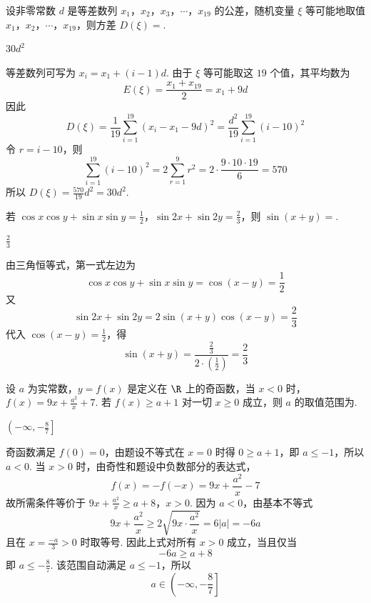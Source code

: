 \begin{problem}
设非零常数 \(d\) 是等差数列 \(x_1\)，\(x_2\)，\(x_3\)，\(\cdots\)，\(x_{19}\) 的公差，随机变量 \(\xi\) 等可能地取值 \(x_1\)，\(x_2\)，\(\cdots\)，\(x_{19}\)，则方差 \(D(\xi)=\)\fillinblank{}.
\begin{answer}
\(30d^2\)
\end{answer}

\begin{solution}
等差数列可写为 \(x_i=x_1+(i-1)d\). 由于 \(\xi\) 等可能取这 \(19\) 个值，其平均数为
\[
E(\xi)=\frac{x_1+x_{19}}{2}=x_1+9d
\]
因此
\[
D(\xi)=\frac{1}{19}\sum_{i=1}^{19}(x_i-x_1-9d)^2
=\frac{d^2}{19}\sum_{i=1}^{19}(i-10)^2
\]
令 \(r=i-10\)，则
\[
\sum_{i=1}^{19}(i-10)^2=2\sum_{r=1}^{9}r^2
=2\cdot\frac{9\cdot10\cdot19}{6}=570
\]
所以 \(D(\xi)=\frac{570}{19}d^2=30d^2\).
\end{solution}
\end{problem}

\begin{problem}
若 \(\cos x\cos y+\sin x\sin y=\frac{1}{2}\)，\(\sin 2x+\sin 2y=\frac{2}{3}\)，则 \(\sin(x+y)=\)\fillinblank{}.
\begin{answer}
\(\frac{2}{3}\)
\end{answer}

\begin{solution}
由三角恒等式，第一式左边为
\[
\cos x\cos y+\sin x\sin y=\cos(x-y)=\frac{1}{2}
\]
又
\[
\sin2x+\sin2y=2\sin(x+y)\cos(x-y)=\frac{2}{3}
\]
代入 \(\cos(x-y)=\frac12\)，得
\[
\sin(x+y)=\frac{\frac{2}{3}}{2\cdot(\frac{1}{2})}=\frac{2}{3}
\]
\end{solution}
\end{problem}

\begin{problem}
设 \(a\) 为实常数，\(y=f(x)\) 是定义在 \(\R\) 上的奇函数，当 \(x<0\) 时， \(f(x)=9x+\frac{a^2}{x}+7\).
若 \(f(x)\geqslant a+1\) 对一切 \(x\geqslant 0\) 成立，则 \(a\) 的取值范围为\fillinblank{}.
\begin{answer}
\(\left(-\infty,-\frac{8}{7}\right]\)
\end{answer}

\begin{solution}
奇函数满足 \(f(0)=0\)，由题设不等式在 \(x=0\) 时得 \(0\geqslant a+1\)，即 \(a\leqslant-1\)，所以 \(a<0\). 当 \(x>0\) 时，由奇性和题设中负数部分的表达式，
\[
f(x)=-f(-x)=9x+\frac{a^2}{x}-7
\]
故所需条件等价于
\(9x+\frac{a^2}{x}\geqslant a+8\)，\(x>0\).
因为 \(a<0\)，由基本不等式
\[
9x+\frac{a^2}{x}\geqslant2\sqrt{9x\cdot\frac{a^2}{x}}=6|a|=-6a
\]
且在 \(x=\frac{-a}{3}>0\) 时取等号. 因此上式对所有 \(x>0\) 成立，当且仅当
\[
-6a\geqslant a+8
\]
即 \(a\leqslant-\frac87\). 该范围自动满足 \(a\leqslant-1\)，所以
\[
a\in\left(-\infty,-\frac87\right]
\]
\end{solution}
\end{problem}

